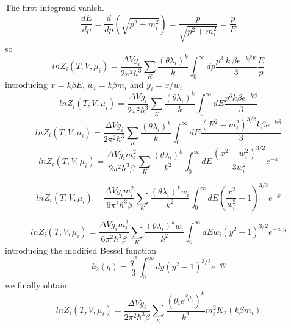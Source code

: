 \documentclass[12pt,a4paper]{book}
\begin{document}
	The first integrand vanish.
	\begin{equation}
		\frac{dE}{dp} = \frac{d}{dp} (\sqrt{p^2+m_i^2}) = \frac{p}{\sqrt{p^2+m_i^2}} = \frac{p}{E}
	\end{equation}
	so
	\begin{equation}
		ln Z_i(T,V,\mu_i)= \frac{\Delta V g_i}{2\pi^2\hbar^3} \sum_{K} \frac{(\theta \lambda_i)^k}{k}  \int_{0}^{\infty} dp \frac{p^3 \  k \  \beta e^{-k \beta E}}{3} \frac{E}{p} 
	\end{equation}
	introducing $x= k\beta E$, $w_i=k\beta m_i$ and $y_i=x/w_i$
	\begin{equation}
		ln Z_i(T,V,\mu_i)= \frac{\Delta V g_i}{2\pi^2\hbar^3} \sum_{K} \frac{(\theta \lambda_i)^k}{k}  \int_{0}^{\infty} dE \frac{p^3 k \beta e^{-k \beta}}{3} 
	\end{equation}
	\begin{equation}
		ln Z_i(T,V,\mu_i)= \frac{\Delta V g_i}{2\pi^2\hbar^3} \sum_{K} \frac{(\theta \lambda_i)^k}{k}  \int_{0}^{\infty} dE \frac{(E^2-m_i^2)^{3/2} k \beta e^{-k \beta}}{3} 
	\end{equation}
	\begin{equation}
		ln Z_i(T,V,\mu_i)= \frac{\Delta V g_i m_i^2}{2\pi^2\hbar^3 \beta} \sum_{K} \frac{(\theta \lambda_i)^k}{k^2}  \int_{0}^{\infty} dE \frac{(x^2-w_i^2)^{3/2}}{3 w_i^2} e^{-x} 
	\end{equation}
	
	\begin{equation}
		ln Z_i(T,V,\mu_i)= \frac{\Delta V g_i m_i^2}{6 \pi^2\hbar^3 \beta} \sum_{K} \frac{(\theta \lambda_i)^k w_i}{k^2}  \int_{0}^{\infty} dE (\frac{x^2}{w_i^2}-1)^{3/2} e^{-x} 
	\end{equation}
	
	\begin{equation}
		ln Z_i(T,V,\mu_i)= \frac{\Delta V g_i m_i^2}{6 \pi^2\hbar^3 \beta} \sum_{K} \frac{(\theta \lambda_i)^k w_i}{k^2}  \int_{0}^{\infty} dE w_i (y^2-1)^{3/2} e^{-w_i y} 
	\end{equation}
	introducing the modified Bessel function 
	\begin{equation}
		k_2(q)= \frac{q^2}{3} \int_{0}^{\infty} dy (y^2-1)^{3/2} e^{-qy}
	\end{equation}
	we finally obtain
	\begin{equation}
		ln Z_i(T,V,\mu_i)= \frac{\Delta V g_i}{2\pi^2\hbar^3\beta} \sum_{K} \frac{(\theta_i e^{\beta \mu_i})^k}{k^2} m_i^2K_2(k\beta m_i)
	\end{equation}
	
	
	
	
	
	
	
	
	
	\printbibliography
	
\end{document}
